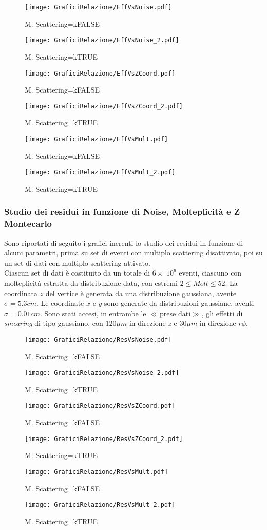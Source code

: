 \documentclass{article}
\begin{document}
\begin{figure}
\texttt{[image: GraficiRelazione/EffVsNoise.pdf]}
\caption{M. Scattering=kFALSE}
\texttt{[image: GraficiRelazione/EffVsNoise\_2.pdf]}
\caption{M. Scattering=kTRUE}
\end{figure}
\begin{figure}
\texttt{[image: GraficiRelazione/EffVsZCoord.pdf]}
\caption{M. Scattering=kFALSE}
\label{fig:effvszcoord}
\texttt{[image: GraficiRelazione/EffVsZCoord\_2.pdf]}
\caption{M. Scattering=kTRUE}
\label{fig:effvszcoord_2}
\end{figure}
\begin{figure}
\texttt{[image: GraficiRelazione/EffVsMult.pdf]}
\caption{M. Scattering=kFALSE}
\label{fig:effvsmolt}
\texttt{[image: GraficiRelazione/EffVsMult\_2.pdf]}
\caption{M. Scattering=kTRUE}
\label{fig:effvsmolt_2}
\end{figure}

\newpage
\subsubsection{Studio dei residui in funzione di Noise, Molteplicità e Z Montecarlo}
Sono riportati di seguito i grafici inerenti lo studio dei residui in funzione di alcuni parametri, prima su set di eventi con multiplo scattering disattivato, poi su un set di dati con multiplo scattering attivato.\\
\indent Ciascun set di dati è costituito da un totale di 
$6\times$ $10^{6}$ eventi, ciascuno con molteplicità estratta da distribuzione data, con estremi $2\leq Molt \leq 52$. La coordinata $z$ del vertice è generata da una distribuzione gaussiana, avente $\sigma=5.3cm$. Le coordinate $x$ e $y$ sono generate da distribuzioni gaussiane, aventi $\sigma=0.01cm$. Sono stati accesi, in entrambe le $\ll$prese dati$\gg$, gli effetti di \textit{smearing} di tipo gaussiano, con $120 \mu m$ in direzione  $z$ e $30 \mu m$ in direzione $r\phi$.

\begin{figure}
\texttt{[image: GraficiRelazione/ResVsNoise.pdf]}
\caption{M. Scattering=kFALSE}
\texttt{[image: GraficiRelazione/ResVsNoise\_2.pdf]}
\caption{M. Scattering=kTRUE}
\end{figure}
\begin{figure}
\texttt{[image: GraficiRelazione/ResVsZCoord.pdf]}
\caption{M. Scattering=kFALSE}
\texttt{[image: GraficiRelazione/ResVsZCoord\_2.pdf]}
\caption{M. Scattering=kTRUE}
\end{figure}
\begin{figure}
\texttt{[image: GraficiRelazione/ResVsMult.pdf]}
\caption{M. Scattering=kFALSE}
\texttt{[image: GraficiRelazione/ResVsMult\_2.pdf]}
\caption{M. Scattering=kTRUE}
\end{figure}
\newpage
\end{document}
